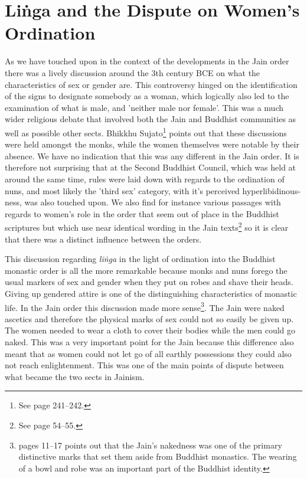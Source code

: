 \section{Liṅga and the Dispute on Women's Ordination}
\label{linga}

As we have touched upon in the context of the developments in the Jain order there was a lively discussion around the 3th century BCE on what the characteristics of sex or gender are. This controversy hinged on the identification of the signs to designate somebody as a woman, which logically also led to the examination of what is male, and 'neither male nor female'. This was a much wider religious debate that involved both the Jain and Buddhist communities as well as possible other sects. Bhikkhu Sujato\footnote{See \cite{sujato2009} page 241–242.} points out that these discussions were held amongst the monks, while the women themselves were notable by their absence. We have no indication that this was any different in the Jain order. It is therefore not surprising that at the Second Buddhist Council, which was held at around the same time, rules were laid down with regards to the ordination of nuns, and most likely the 'third sex' category, with it's perceived hyperlibidinous-ness, was also touched upon. We also find for instance various passages with regards to women's role in the order that seem out of place in the Buddhist scriptures but which use near identical wording in the Jain texts\footnote{See \cite{sujato2009} page 54–55.} so it is clear that there was a distinct influence between the orders.

This discussion regarding {\em liṅga} in the light of ordination into the Buddhist monastic order is all the more remarkable because monks and nuns forego the usual markers of sex and gender when they put on robes and shave their heads. Giving up gendered attire is one of the distinguishing characteristics of monastic life. In the Jain order this discussion made more sense\footnote{\cite{maes2016} pages 11–17 points out that the Jain's nakedness was one of the primary distinctive marks that set them aside from Buddhist monastics. The wearing of a bowl and robe was an important part of the Buddhist identity.}. The Jain were naked ascetics and therefore the physical marks of sex could not so easily be given up. The women needed to wear a cloth to cover their bodies while the men could go naked. This was a very important point for the Jain because this difference also meant that as women could not let go of all earthly possessions they could also not reach enlightenment. This was one of the main points of dispute between what became the two sects in Jainism.

